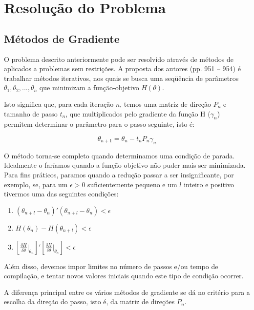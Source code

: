 \documentclass{abnt}
\begin{document}




\chapter{Resolução do Problema}



\section {Métodos de Gradiente}

O problema descrito anteriormente pode ser resolvido através de métodos de aplicados a problemas sem restrições. A proposta dos autores (pp. 951 -- 954) é trabalhar métodos iterativos, nos quais se busca uma seqüência de parâmetros $\theta_{1}, \theta_{2}, ... , \theta_{n}$ que minimizam a função-objetivo  $H(\theta)$.

Isto significa que, para cada iteração $n$, temos uma matriz de direção $P_{n}$ e tamanho de passo $t_{n}$, que multiplicados pelo gradiente da função H ($\gamma_{n}$) permitem determinar o parâmetro para o passo seguinte, isto é:

\[ \theta_{n+1} = \theta_{n} - t_{n}P_{n}\gamma_{n} \]

O método torna-se completo quando determinamos uma condição de parada. Idealmente o faríamos quando a função objetivo não puder mais ser minimizada. Para fins práticos, paramos quando a redução passar a ser insignificante, por exemplo, se, para um $\epsilon > 0$ suficientemente pequeno e um $l$ inteiro e positivo tivermos uma das seguintes condições:

\begin{enumerate}
\item $ ( \theta_{n+l} - \theta_n )'( \theta_{n+l} - \theta_n ) < \epsilon$
\item $ H(  \theta_n )- H (\theta_{n+l} ) < \epsilon$
\item $  [\frac{\delta H}{\delta \theta}\vert_{\theta_n}]'[\frac{\delta H}{\delta \theta}\vert_{\theta_n}] < \epsilon$
\end{enumerate}

Além disso, devemos impor limites no número de passos e/ou tempo de compilação, e tentar novos valores iniciais quando este tipo de condição ocorrer.

A diferença principal entre os vários métodos de gradiente se dá no critério para a escolha da direção do passo, isto é, da matriz de direções $P_n$.
\end{document}
